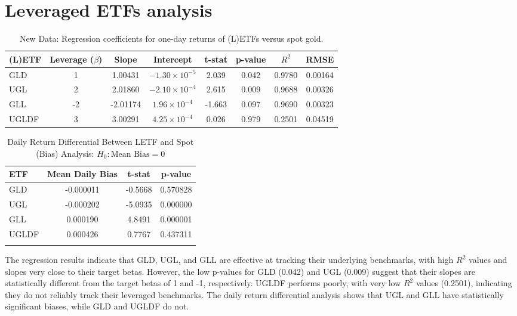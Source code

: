 \documentclass{article}
\begin{document}
\clearpage
\section{Leveraged ETFs analysis}

\begin{table}[h!]
\centering
\begin{tabular}{lccccccc}
\toprule
\textbf{(L)ETF} & \textbf{Leverage ($\beta$)} & \textbf{Slope} & \textbf{Intercept} & \textbf{t-stat} & \textbf{p-value} & \textbf{$R^2$} & \textbf{RMSE} \\
\midrule
GLD & \phantom{-}1 & \phantom{-}1.00431 & $-1.30 \times 10^{-5}$ & \phantom{-}2.039 & 0.042 & 0.9780 & 0.00164 \\
UGL & \phantom{-}2 & \phantom{-}2.01860 & $-2.10 \times 10^{-4}$ & \phantom{-}2.615 & 0.009 & 0.9688 & 0.00326 \\
GLL & -2 & -2.01174 & \phantom{$-$}$1.96 \times 10^{-4}$ & -1.663 & 0.097 & 0.9690 & 0.00323 \\
UGLDF & \phantom{-}3 & \phantom{-}3.00291 
& \phantom{$-$}$4.25 \times 10^{-4}$ & \phantom{-}0.026 & 0.979 & 0.2501 & 0.04519 \\
\bottomrule
\end{tabular}
\caption{New Data: Regression coefficients for one-day returns of (L)ETFs versus spot gold.}
\label{tab:new_data_etf_coeffs}
\end{table}

\begin{table}[H]
\centering
\caption{Daily Return Differential Between LETF and Spot (Bias) Analysis: $H_0: \text{Mean Bias} = 0$}
\label{tab:tracking_bias}
\begin{tabular}{lccc}
\toprule
\textbf{ETF} & \textbf{Mean Daily Bias} & \textbf{t-stat} & \textbf{p-value} \\
\midrule
GLD   & -0.000011 & -0.5668 & 0.570828 \\
UGL   & -0.000202 & -5.0935 & 0.000000 \\
GLL   & 0.000190  & 4.8491  & 0.000001 \\
UGLDF & 0.000426  & 0.7767  & 0.437311 \\
\bottomrule
\multicolumn{4}{l}{\footnotesize}
\end{tabular}
\end{table}

The regression results indicate that GLD, UGL, and GLL are effective at tracking their underlying benchmarks, with high $R^2$ values and slopes very close to their target betas.
However, the low p-values for GLD (0.042) and UGL (0.009) suggest that their slopes are statistically different from the target betas of 1 and -1, respectively. 
UGLDF performs poorly, with very low $R^2$ values (0.2501), indicating they do not reliably track their leveraged benchmarks.
The daily return differential analysis shows that UGL and GLL have statistically significant biases,
while GLD and UGLDF do not.
\end{document}
